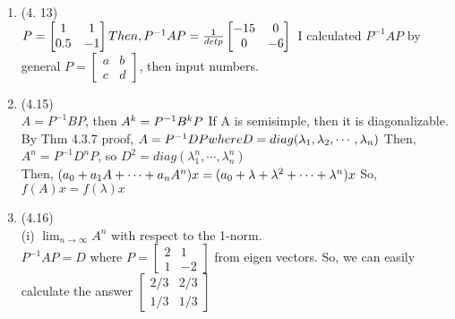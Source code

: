 \documentclass[letterpaper,12pt]{article}
\theoremstyle{definition}
\begin{document}
\begin{enumerate}
(ii)
$D=\begin{bmatrix} 0&1&0&0 \\ -1&0&0&0 \\ 0&0&0&2 \\ 0&0&-2&0 \end{bmatrix}\begin{bmatrix} sinx \\ cosx \\sin2x \\cos2x\end{bmatrix}$
\\
\\
(iii)
$span[(1,0,0,0),(0,1,0,0)]$ and $span[(0,0,1,0), (0,0,0,1)]$

	\item (4. 13) \\
$P = \begin{bmatrix} 1&1 \\ 0.5&-1 \end{bmatrix}\\
Then, P^{-1}AP=\frac{1}{detp} \begin{bmatrix} -15&0 \\ 0&-6 \end{bmatrix}\\$
I calculated $P^{-1}AP$ by general $P=\begin{bmatrix} a&b \\ c&d \end{bmatrix}$, then input numbers.



	\item (4.15) \\
$A=P^{-1}BP$, then $A^k= P^{-1}B^kP\\$
If A is semisimple, then it is diagonalizable. By Thm 4.3.7 proof, $A=P^{-1}DP where D=diag(\lambda_1,\lambda_2, \cdots, \lambda_n)\\$
Then, 
$A^n= P^{-1}D^nP$, so $D^2=diag(\lambda_1^{n}, \cdots, \lambda_n^{n})$\\
Then, $(a_0+a_1A+ \cdots +a_nA^n)x=(a_0+\lambda + \lambda^2 + \cdots + \lambda^n)x\\$
So, $f(A)x = f(\lambda)x$





	\item (4.16) \\
(i) $\lim_{n\rightarrow\infty} A^n $ with respect to the 1-norm. \\
$P^{-1}AP=D$ where $P=\begin{bmatrix} 2&1 \\ 1&-2 \end{bmatrix}$ from eigen vectors.
So, we can easily calculate the answer $\begin{bmatrix} 2/3&2/3 \\ 1/3& 1/3\end{bmatrix}$ \\


\end{enumerate}
\end{document}
